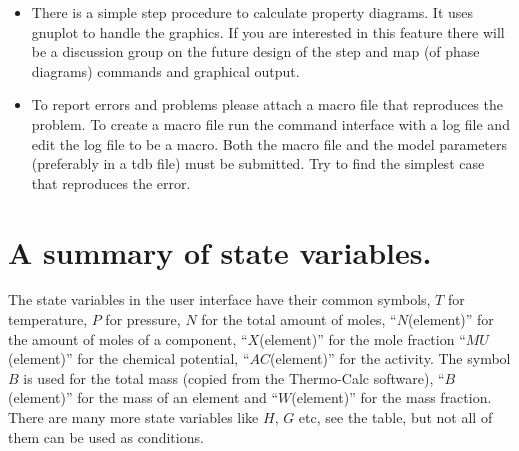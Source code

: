 \documentclass[12pt]{article}
\begin{document}
\begin{itemize}
\item There is a simple step procedure to calculate property diagrams.
It uses gnuplot to handle the graphics.  If you are interested in this
feature there will be a discussion group on the future design of the
step and map (of phase diagrams) commands and graphical output.

\item To report errors and problems please attach a macro file that
reproduces the problem.  To create a macro file run the command
interface with a log file and edit the log file to be a macro.  Both
the macro file and the model parameters (preferably in a tdb file)
must be submitted.  Try to find the simplest case that reproduces the
error.
\end{itemize}

\section{A summary of state variables.}

The state variables in the user interface have their common symbols,
$T$ for temperature, $P$ for pressure, $N$ for the total amount of
moles, ``$N$(element)'' for the amount of moles of a component,
``$X$(element)'' for the mole fraction ``$MU$(element)'' for the
chemical potential, ``$AC$(element)'' for the activity.  The symbol
$B$ is used for the total mass (copied from the Thermo-Calc software),
``$B$(element)'' for the mass of an element and ``$W$(element)'' for
the mass fraction.  There are many more state variables like $H$, $G$
etc, see the table, but not all of them can be used as conditions.
\end{document}
